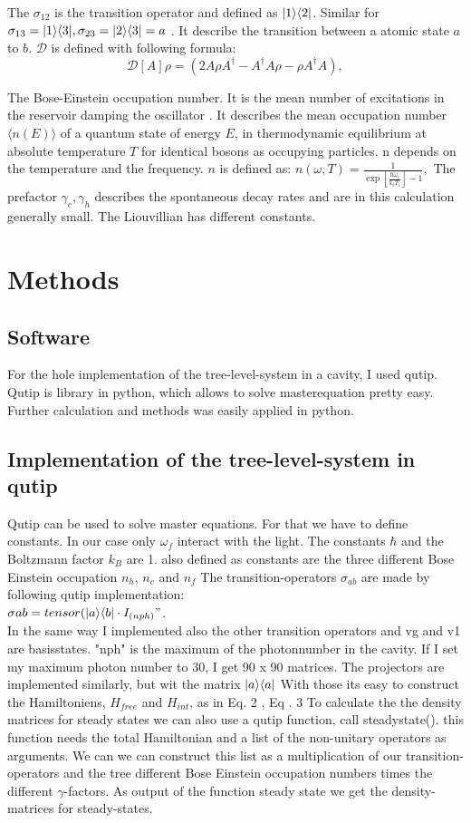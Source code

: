 \documentclass[12pt,a4paper]{article}
\makeatletter
\DeclarePairedDelimiter\bra{\langle}{\rvert}
\DeclarePairedDelimiter\ket{\lvert}{\rangle}
\def\eqref{\@ifstar\@eqref\@@eqref}
\def\@eqref#1{\textup{\tagform@{\ref*{#1}}}}
\def\@@eqref#1{\textup{\tagform@{\ref{#1}}}}
\makeatother
\begin{document}
The $\sigma_{12} $ is the transition operator and defined as $ \ket{1}\bra{2}$. Similar for $\sigma_{13}=\ket{1}\bra{3}, \sigma_{23}=\ket{2}\bra{3}=a$ . It describe the transition between a atomic state $a$ to $b$.
$\mathcal{D}$ is defined with following formula:
\begin{equation}
\mathcal{D}[A]\rho=(2A \rho	A^{\dag}-A^{\dag}A\rho-\rho A^{\dag}A),
\end{equation}

The Bose-Einstein occupation number. It is the mean number of excitations in the reservoir damping the oscillator  . It describes the mean occupation number $\langle n(E) \rangle$ of a quantum state of energy $E$, in thermodynamic equilibrium at absolute temperature $T $ for identical bosons as occupying particles. n depends on the temperature and the frequency.
$n$ is defined as:
$
n(\omega,T)=\frac{1}{\exp[\frac{\hbar \omega_i}{k_b T_i}]-1},
$
The  prefactor $\gamma_c ,\gamma_h$ describes the spontaneous decay rates and are in this calculation generally small.
The Liouvillian has different constants. 
\section{Methods}
\subsection{Software}
For the hole implementation of the tree-level-system in a cavity, I used qutip. Qutip is library in python, which allows to solve masterequation pretty easy.
Further calculation and methods was easily applied in python. 
\subsection{Implementation of the tree-level-system in qutip}
Qutip can be used to solve master equations. For that we have to define constants.  
In our case only $\omega_f$ interact with the light. 
The constants $\hbar $ and the Boltzmann factor $k_B$ are 1.
also defined as constants are the three different Bose Einstein occupation $n_h$, $n_c$ and $n_f$
The transition-operators $\sigma_{ab}$ are  made by following qutip implementation:\\ $\sigma_{}ab=tensor(\ket{a}\bra{b}\cdot I_{(nph)}"$.\\
In the same way I implemented also the other transition operators and 
vg and v1 are basisstates.  "nph" is the maximum of the photonnumber in the cavity. If I set my maximum photon number to 30, I get 90 x 90 matrices. 
The projectors are implemented similarly, but wit the matrix $\ket{a}\bra{a}$
With those its easy to construct the Hamiltoniens, $H_{free}$ and $H_{int}$, as in Eq. \eqref{2} , Eq . \eqref{3} 
To calculate the the density matrices for steady states we can also use a qutip function, call steadystate().
this function needs the total Hamiltonian and a list of the non-unitary operators as arguments.
We can we can construct this list as a multiplication of our transition-operators and the tree different Bose Einstein occupation numbers times the different $\gamma$-factors. 
As output of the function steady state we get the density-matrices for steady-states. \cite{Nation2022}
\end{document}
